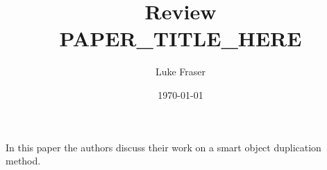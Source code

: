 \documentclass{article}
\begin{document}
\title{{\large Review} \\ PAPER_TITLE_HERE}
\author{Luke Fraser}
\date{\today}
\maketitle

\begingroup
\renewcommand{\section}[2]{}


\endgroup

\section*{Summary}
In this paper the authors discuss their work on a smart object duplication method.
\section*{Strengths}

\section*{Critique}

\cite{goossens93}
\end{document}
